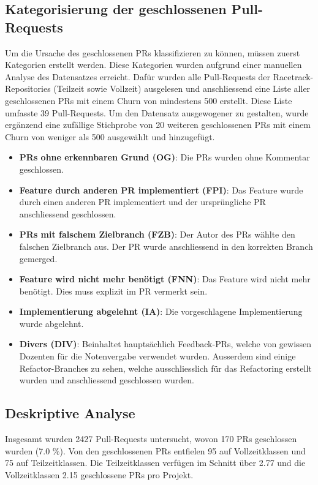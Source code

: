 \subsection{Kategorisierung der geschlossenen Pull-Requests}
\label{sec:KategorienGeschlossenePRs} 
Um die Ursache des geschlossenen PRs klassifizieren zu können, müssen zuerst Kategorien erstellt werden. Diese Kategorien wurden aufgrund einer manuellen Analyse des Datensatzes erreicht. 
Dafür wurden alle Pull-Requests der Racetrack-Repositories (Teilzeit sowie Vollzeit) ausgelesen und anschliessend eine Liste aller geschlossenen PRs mit einem Churn von mindestens 500 erstellt. Diese Liste umfasste 39 Pull-Requests. Um den Datensatz ausgewogener zu gestalten, wurde ergänzend eine zufällige Stichprobe von 20 weiteren geschlossenen PRs mit einem Churn von weniger als 500 ausgewählt und hinzugefügt.

\begin{itemize}
    \item \textbf{PRs ohne erkennbaren Grund (OG)}: Die PRs wurden ohne Kommentar geschlossen.
    \item \textbf{Feature durch anderen PR implementiert (FPI)}: Das Feature wurde durch einen anderen PR implementiert und der ursprüngliche PR anschliessend geschlossen.
    \item \textbf{PRs mit falschem Zielbranch (FZB)}: Der Autor des PRs wählte den falschen Zielbranch aus. Der PR wurde anschliessend in den korrekten Branch gemerged.
    \item \textbf{Feature wird nicht mehr benötigt (FNN)}: Das Feature wird nicht mehr benötigt. Dies muss explizit im PR vermerkt sein.
    \item \textbf{Implementierung abgelehnt (IA)}: Die vorgeschlagene Implementierung wurde abgelehnt.
    \item \textbf{Divers (DIV)}: Beinhaltet hauptsächlich Feedback-PRs, welche von gewissen Dozenten für die Notenvergabe verwendet wurden. Ausserdem sind einige Refactor-Branches zu sehen, welche ausschliesslich für das Refactoring erstellt wurden und anschliessend geschlossen wurden. 
\end{itemize}

\newpage
\subsection{Deskriptive Analyse}
Insgesamt wurden 2427 Pull-Requests untersucht, wovon 170 PRs geschlossen wurden (7.0 \%). Von den geschlossenen PRs entfielen 95 auf Vollzeitklassen und 75 auf Teilzeitklassen. Die Teilzeitklassen verfügen im Schnitt über 2.77 und die Vollzeitklassen 2.15 geschlossene PRs pro Projekt. 


